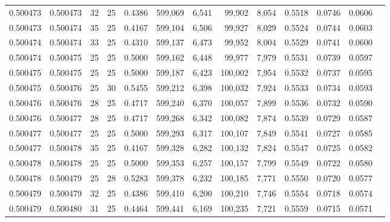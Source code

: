 \begin{tabular}{rrrrrrrrrrrrr}
0.500473 & 0.500473 &    32 &  25 &                                     0.4386 & 599,069 &   6,541 &  99,902 &   8,054 & 0.5518 & 0.0746 & 0.0606 \\
0.500473 & 0.500474 &    35 &  25 &                                     0.4167 & 599,104 &   6,506 &  99,927 &   8,029 & 0.5524 & 0.0744 & 0.0603 \\
0.500474 & 0.500474 &    33 &  25 &                                     0.4310 & 599,137 &   6,473 &  99,952 &   8,004 & 0.5529 & 0.0741 & 0.0600 \\
0.500474 & 0.500475 &    25 &  25 &                                     0.5000 & 599,162 &   6,448 &  99,977 &   7,979 & 0.5531 & 0.0739 & 0.0597 \\
0.500475 & 0.500475 &    25 &  25 &                                     0.5000 & 599,187 &   6,423 & 100,002 &   7,954 & 0.5532 & 0.0737 & 0.0595 \\
0.500475 & 0.500476 &    25 &  30 &                                     0.5455 & 599,212 &   6,398 & 100,032 &   7,924 & 0.5533 & 0.0734 & 0.0593 \\
0.500476 & 0.500476 &    28 &  25 &                                     0.4717 & 599,240 &   6,370 & 100,057 &   7,899 & 0.5536 & 0.0732 & 0.0590 \\
0.500476 & 0.500477 &    28 &  25 &                                     0.4717 & 599,268 &   6,342 & 100,082 &   7,874 & 0.5539 & 0.0729 & 0.0587 \\
0.500477 & 0.500477 &    25 &  25 &                                     0.5000 & 599,293 &   6,317 & 100,107 &   7,849 & 0.5541 & 0.0727 & 0.0585 \\
0.500477 & 0.500478 &    35 &  25 &                                     0.4167 & 599,328 &   6,282 & 100,132 &   7,824 & 0.5547 & 0.0725 & 0.0582 \\
0.500478 & 0.500478 &    25 &  25 &                                     0.5000 & 599,353 &   6,257 & 100,157 &   7,799 & 0.5549 & 0.0722 & 0.0580 \\
0.500478 & 0.500479 &    25 &  28 &                                     0.5283 & 599,378 &   6,232 & 100,185 &   7,771 & 0.5550 & 0.0720 & 0.0577 \\
0.500479 & 0.500479 &    32 &  25 &                                     0.4386 & 599,410 &   6,200 & 100,210 &   7,746 & 0.5554 & 0.0718 & 0.0574 \\
0.500479 & 0.500480 &    31 &  25 &                                     0.4464 & 599,441 &   6,169 & 100,235 &   7,721 & 0.5559 & 0.0715 & 0.0571 \\

\end{tabular}
